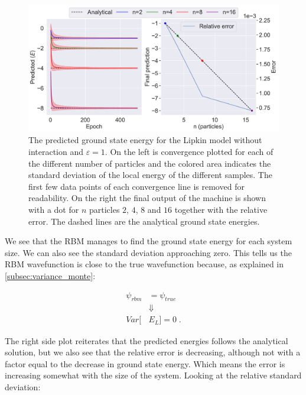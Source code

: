 \begin{figure}[H]
  \centering
  \includegraphics[width=\textwidth]{Figures/Plots/Implementation Test/Lipkin2-16.pdf}
  \caption{The predicted ground state energy for the Lipkin model without interaction and $\varepsilon = 1$. On the left is convergence plotted for each of the different number of particles and the colored area indicates the standard deviation of the local energy of the different samples. The first few data points of each convergence line is removed for readability. On the right the final output of the machine is shown with a dot for $n$ particles $2$, $4$, $8$ and $16$ together with the relative error. The dashed lines are the analytical ground state energies.}
  \label{fig:test_ground_lipkin}
\end{figure}

We see that the RBM manages to find the ground state energy for each system size. We can also see the standard deviation approaching zero. This tells us the RBM wavefunction is close to the true wavefunction because, as explained in \ref{subsec:variance_monte}:

\begin{align*} 
  \psi_{rbm} &= \psi_{true} \\
             &\Downarrow \\
  Var[&E_L] = 0 \; .
\end{align*}

The right side plot reiterates that the predicted energies follows the analytical solution, but we also see that the relative error is decreasing, although not with a factor equal to the decrease in ground state energy. Which means the error is increasing somewhat with the size of the system. Looking at the relative standard deviation:


